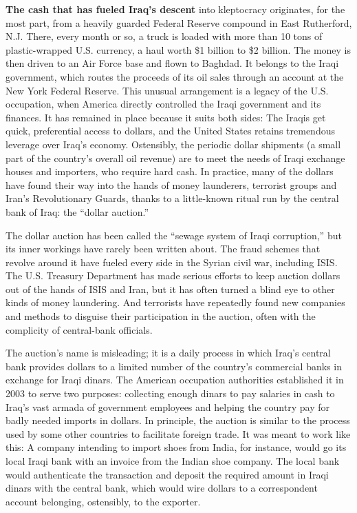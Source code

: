 \textbf{The cash that has fueled Iraq's descent} into kleptocracy
originates, for the most part, from a heavily guarded Federal Reserve
compound in East Rutherford, N.J. There, every month or so, a truck is
loaded with more than 10 tons of plastic-wrapped U.S. currency, a haul
worth \$1 billion to \$2 billion. The money is then driven to an Air
Force base and flown to Baghdad. It belongs to the Iraqi government,
which routes the proceeds of its oil sales through an account at the New
York Federal Reserve. This unusual arrangement is a legacy of the U.S.
occupation, when America directly controlled the Iraqi government and
its finances. It has remained in place because it suits both sides: The
Iraqis get quick, preferential access to dollars, and the United States
retains tremendous leverage over Iraq's economy. Ostensibly, the
periodic dollar shipments (a small part of the country's overall oil
revenue) are to meet the needs of Iraqi exchange houses and importers,
who require hard cash. In practice, many of the dollars have found their
way into the hands of money launderers, terrorist groups and Iran's
Revolutionary Guards, thanks to a little-known ritual run by the central
bank of Iraq: the ``dollar auction.''

The dollar auction has been called the ``sewage system of Iraqi
corruption,'' but its inner workings have rarely been written about. The
fraud schemes that revolve around it have fueled every side in the
Syrian civil war, including ISIS. The U.S. Treasury Department has made
serious efforts to keep auction dollars out of the hands of ISIS and
Iran, but it has often turned a blind eye to other kinds of money
laundering. And terrorists have repeatedly found new companies and
methods to disguise their participation in the auction, often with the
complicity of central-bank officials.

The auction's name is misleading; it is a daily process in which Iraq's
central bank provides dollars to a limited number of the country's
commercial banks in exchange for Iraqi dinars. The American occupation
authorities established it in 2003 to serve two purposes: collecting
enough dinars to pay salaries in cash to Iraq's vast armada of
government employees and helping the country pay for badly needed
imports in dollars. In principle, the auction is similar to the process
used by some other countries to facilitate foreign trade. It was meant
to work like this: A company intending to import shoes from India, for
instance, would go its local Iraqi bank with an invoice from the Indian
shoe company. The local bank would authenticate the transaction and
deposit the required amount in Iraqi dinars with the central bank, which
would wire dollars to a correspondent account belonging, ostensibly, to
the exporter.

